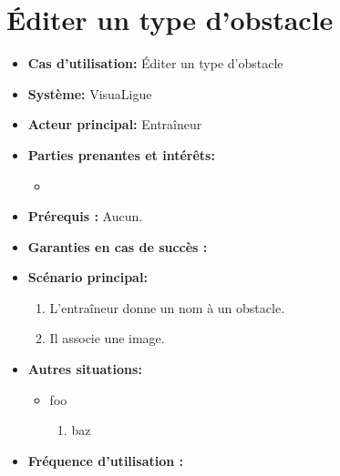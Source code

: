 \section{Éditer un type d'obstacle}
\label{sec:editer_un_type_d_obstacle}

\begin{itemize}
    \item \textbf{Cas d'utilisation:} \'Editer un type d'obstacle
    \item \textbf{Syst\`eme:} VisuaLigue
    \item \textbf{Acteur principal:} Entra\^ineur
    \item \textbf{Parties prenantes et int\'er\^ets:}
    	\begin{itemize}
    		\item
    	\end{itemize}
    \item \textbf{Pr\'erequis :} Aucun.
    \item \textbf{Garanties en cas de succ\`es :}
    \item \textbf{Sc\'enario principal:}
        \begin{enumerate}
            \item L'entraîneur donne un nom à un obstacle.
            \item Il associe une image.
        \end{enumerate}
    \item \textbf{Autres situations:}
        \begin{itemize}
            \item foo
                \begin{enumerate}
                    \item baz
                \end{enumerate}
        \end{itemize}
    \item \textbf{Fréquence d'utilisation :}
\end{itemize}



